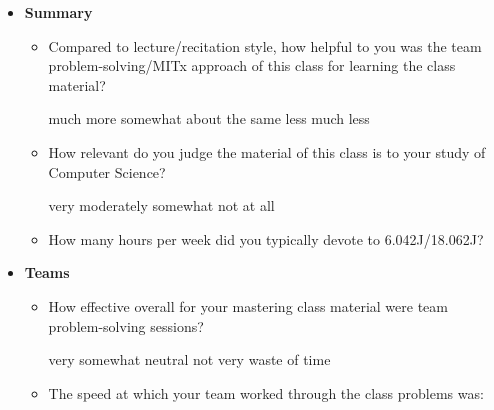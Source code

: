 \documentclass[handout]{mcs}
\begin{document}
\begin{itemize}

\item \textbf{Summary}

\begin{itemize}

\item Compared to lecture/recitation style, how helpful to you was the
  team problem-solving/MITx approach of this class for learning the
  class material?

\begin{center}
much more \hspace{0.3in} somewhat \hspace{0.3in} about the
same \hspace{0.3in} less \hspace{0.3in} much less
\end{center}

\item How relevant do you judge the material of this class is to your
  study of Computer Science?

\begin{center}
very\hspace{0.3in} moderately\hspace{0.3in} somewhat \hspace{0.3in} not at all
\end{center}

\item How many hours per week did you typically devote to 6.042J/18.062J?\brule{0.6in}

\end{itemize}

\item \textbf{Teams}
\begin{itemize}

\item How effective overall for your mastering class material were
  team problem-solving sessions?

\begin{center}
very\hspace{0.5in} somewhat \hspace{0.5in} neutral\hspace{0.5in} not
very \hspace{0.5in} waste of time
\end{center}

\item The speed at which your team worked through the class problems was:


\end{itemize}
\end{itemize}
\end{document}
